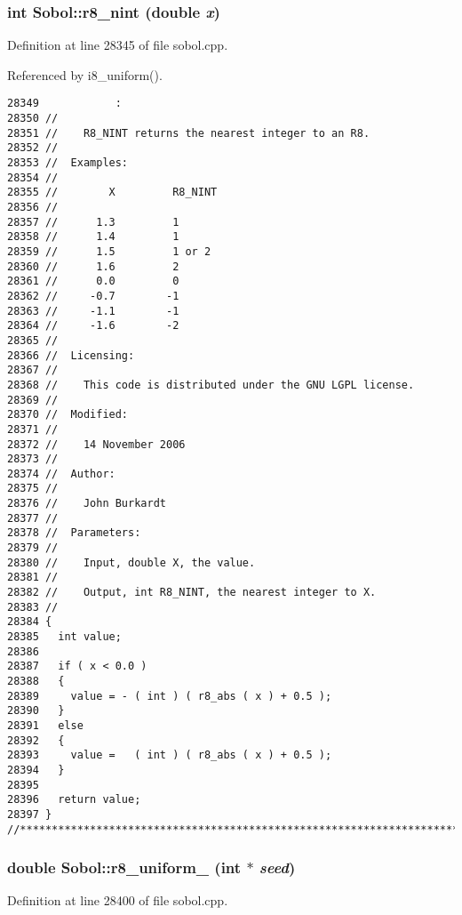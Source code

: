 \subsubsection{\setlength{\rightskip}{0pt plus 5cm}int Sobol::r8\_\-nint (double {\em x})}\label{namespaceSobol_83688fca088fa994ae33d851458f3473}




Definition at line 28345 of file sobol.cpp.

Referenced by i8\_\-uniform().

\begin{Code}\begin{verbatim}28349            :
28350 //
28351 //    R8_NINT returns the nearest integer to an R8.
28352 //
28353 //  Examples:
28354 //
28355 //        X         R8_NINT
28356 //
28357 //      1.3         1
28358 //      1.4         1
28359 //      1.5         1 or 2
28360 //      1.6         2
28361 //      0.0         0
28362 //     -0.7        -1
28363 //     -1.1        -1
28364 //     -1.6        -2
28365 //
28366 //  Licensing:
28367 //
28368 //    This code is distributed under the GNU LGPL license. 
28369 //
28370 //  Modified:
28371 //
28372 //    14 November 2006
28373 //
28374 //  Author:
28375 //
28376 //    John Burkardt
28377 //
28378 //  Parameters:
28379 //
28380 //    Input, double X, the value.
28381 //
28382 //    Output, int R8_NINT, the nearest integer to X.
28383 //
28384 {
28385   int value;
28386 
28387   if ( x < 0.0 )
28388   {
28389     value = - ( int ) ( r8_abs ( x ) + 0.5 );
28390   }
28391   else
28392   {
28393     value =   ( int ) ( r8_abs ( x ) + 0.5 );
28394   }
28395 
28396   return value;
28397 }
//****************************************************************************80
\end{verbatim}
\end{Code}


\subsubsection{\setlength{\rightskip}{0pt plus 5cm}double Sobol::r8\_\-uniform\_ (int $\ast$ {\em seed})}\label{namespaceSobol_c471c7517d377c20a1bab58faa94f819}




Definition at line 28400 of file sobol.cpp.

